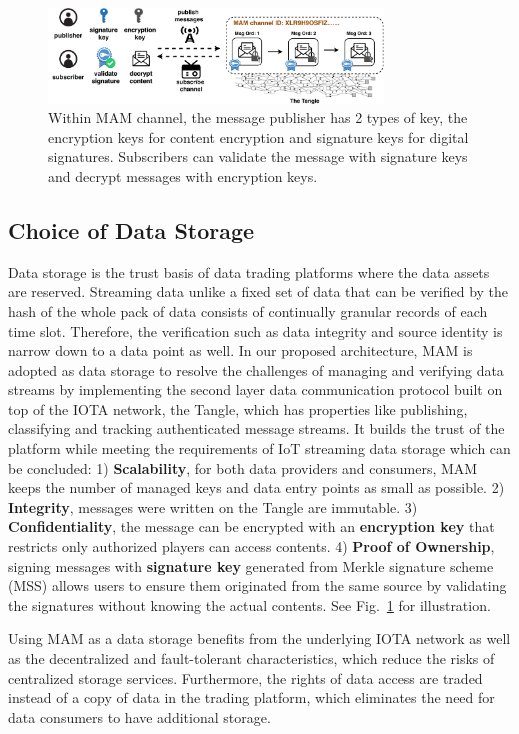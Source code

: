 \documentclass[10pt, conference, compsocconf]{IEEEtran}
\begin{document}
\begin{figure}[h]
    \centering
    \includegraphics[width=3.5in]{channel_and_key_fold}
    \caption{Within MAM channel, the message publisher has 2 types of key, the encryption keys for content encryption and signature keys for digital signatures. Subscribers can validate the message with signature keys and decrypt messages with encryption keys.}
    \label{fig:channel_and_key}
\end{figure}

\subsection{Choice of Data Storage}
Data storage is the trust basis of data trading platforms where the data assets are reserved. Streaming data unlike a fixed set of data that can be verified by the hash of the whole pack of data consists of continually granular records of each time slot. Therefore, the verification such as data integrity and source identity is narrow down to a data point as well. In our proposed architecture, MAM is adopted as data storage to resolve the challenges of managing and verifying data streams by implementing the second layer data communication protocol built on top of the IOTA network, the Tangle, which has properties like publishing, classifying and tracking authenticated message streams. It builds the trust of the platform while meeting the requirements of IoT streaming data storage which can be concluded: 1) \textbf{Scalability}, for both data providers and consumers, MAM keeps the number of managed keys and data entry points as small as possible. 2) \textbf{Integrity}, messages were written on the Tangle are immutable. 3) \textbf{Confidentiality}, the message can be encrypted with an \textbf{encryption key} that restricts only authorized players can access contents. 4) \textbf{Proof of Ownership}, signing messages with \textbf{signature key} generated from Merkle signature scheme\cite{MSS} (MSS) allows users to ensure them originated from the same source by validating the signatures without knowing the actual contents. See Fig.~\ref{fig:channel_and_key} for illustration.

Using MAM as a data storage benefits from the underlying IOTA network as well as the decentralized and fault-tolerant characteristics, which reduce the risks of centralized storage services. Furthermore, the rights of data access are traded instead of a copy of data in the trading platform, which eliminates the need for data consumers to have additional storage.
\end{document}
